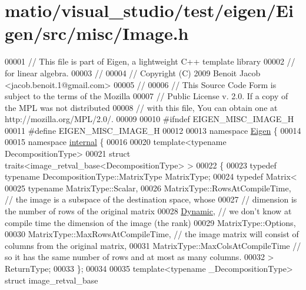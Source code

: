\hypertarget{matio_2visual__studio_2test_2eigen_2_eigen_2src_2misc_2_image_8h_source}{}\section{matio/visual\+\_\+studio/test/eigen/\+Eigen/src/misc/\+Image.h}
\label{matio_2visual__studio_2test_2eigen_2_eigen_2src_2misc_2_image_8h_source}

\begin{DoxyCode}
00001 \textcolor{comment}{// This file is part of Eigen, a lightweight C++ template library}
00002 \textcolor{comment}{// for linear algebra.}
00003 \textcolor{comment}{//}
00004 \textcolor{comment}{// Copyright (C) 2009 Benoit Jacob <jacob.benoit.1@gmail.com>}
00005 \textcolor{comment}{//}
00006 \textcolor{comment}{// This Source Code Form is subject to the terms of the Mozilla}
00007 \textcolor{comment}{// Public License v. 2.0. If a copy of the MPL was not distributed}
00008 \textcolor{comment}{// with this file, You can obtain one at http://mozilla.org/MPL/2.0/.}
00009 
00010 \textcolor{preprocessor}{#ifndef EIGEN\_MISC\_IMAGE\_H}
00011 \textcolor{preprocessor}{#define EIGEN\_MISC\_IMAGE\_H}
00012 
00013 \textcolor{keyword}{namespace }\hyperlink{namespace_eigen}{Eigen} \{ 
00014 
00015 \textcolor{keyword}{namespace }\hyperlink{namespaceinternal}{internal} \{
00016 
00020 \textcolor{keyword}{template}<\textcolor{keyword}{typename} DecompositionType>
00021 \textcolor{keyword}{struct }traits<image\_retval\_base<DecompositionType> >
00022 \{
00023   \textcolor{keyword}{typedef} \textcolor{keyword}{typename} DecompositionType::MatrixType MatrixType;
00024   \textcolor{keyword}{typedef} Matrix<
00025     \textcolor{keyword}{typename} MatrixType::Scalar,
00026     MatrixType::RowsAtCompileTime, \textcolor{comment}{// the image is a subspace of the destination space, whose}
00027                                    \textcolor{comment}{// dimension is the number of rows of the original matrix}
00028     \hyperlink{namespace_eigen_ad81fa7195215a0ce30017dfac309f0b2}{Dynamic},                       \textcolor{comment}{// we don't know at compile time the dimension of the image (the
       rank)}
00029     MatrixType::Options,
00030     MatrixType::MaxRowsAtCompileTime, \textcolor{comment}{// the image matrix will consist of columns from the original matrix,}
00031     MatrixType::MaxColsAtCompileTime  \textcolor{comment}{// so it has the same number of rows and at most as many columns.}
00032   > ReturnType;
00033 \};
00034 
00035 \textcolor{keyword}{template}<\textcolor{keyword}{typename} \_DecompositionType> \textcolor{keyword}{struct }image\_retval\_base

\end{DoxyCode}
